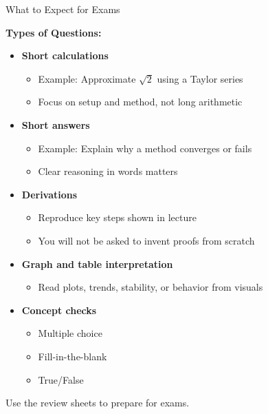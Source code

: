 \documentclass[10pt]{beamer}
\begin{document}
\begin{frame}{What to Expect for Exams}

\textbf{Types of Questions:}
\begin{itemize}
    \item \textbf{Short calculations}  
    \begin{itemize}
        \item Example: Approximate $\sqrt{2}$ using a Taylor series
        \item Focus on setup and method, not long arithmetic
    \end{itemize}

    \item \textbf{Short answers}  
    \begin{itemize}
        \item Example: Explain why a method converges or fails
        \item Clear reasoning in words matters
    \end{itemize}

    \item \textbf{Derivations}  
    \begin{itemize}
        \item Reproduce key steps shown in lecture
        \item You will not be asked to invent proofs from scratch
    \end{itemize}

    \item \textbf{Graph and table interpretation}  
    \begin{itemize}
        \item Read plots, trends, stability, or behavior from visuals
    \end{itemize}

    \item \textbf{Concept checks}
    \begin{itemize}
        \item Multiple choice
        \item Fill-in-the-blank
        \item True/False 
    \end{itemize}
\end{itemize}
\begin{center}
    Use the review sheets to prepare for exams.
\end{center}
\end{frame}
\end{document}
